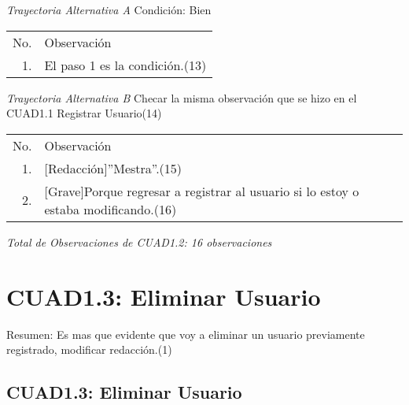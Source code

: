 \documentclass[10pt,spanish]{article}
\providecommand{\tabularnewline}{\\}
\begin{document}
\newpage
\textit{Trayectoria Alternativa A}
Condición: Bien
\begin{longtable}{rp{8cm}}
No.  & Observación\tabularnewline
1.  & El paso 1 es la condición.(13)\tabularnewline
\end{longtable}

\textit{Trayectoria Alternativa B}
Checar la misma observación que se hizo en el CUAD1.1 Registrar Usuario(14)
\begin{longtable}{rp{8cm}}
No.  & Observación\tabularnewline
1.  & [Redacción]''Mestra''.(15)\tabularnewline
2.  & [Grave]Porque regresar a registrar al usuario si lo estoy o estaba modificando.(16)\tabularnewline
\end{longtable}
\textit{Total de Observaciones de CUAD1.2: 16 observaciones}
\newpage
\section{CUAD1.3: Eliminar Usuario}
Resumen: Es mas que evidente que voy a eliminar un usuario previamente registrado, modificar redacción.(1)
\subsection{CUAD1.3: Eliminar Usuario}
\end{document}

